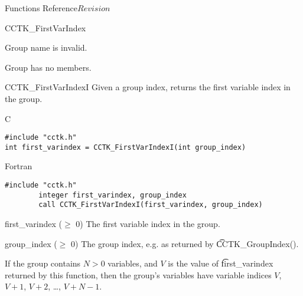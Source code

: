 \begin{cactuspart}{ Functions Reference}{}{$Revision$}
\begin{FunctionDescription}{CCTK\_FirstVarIndex}
\begin{ErrorSection}
\begin{Error}{-1}
Group name is invalid.
\end{Error}
\begin{Error}{-2}
Group has no members.
\end{Error}
\end{ErrorSection}
\end{FunctionDescription}


\begin{FunctionDescription}{CCTK\_FirstVarIndexI}
\label{CCTK-FirstVarIndexI}
Given a group index, returns the first variable index in the group.

\begin{SynopsisSection}
\begin{Synopsis}{C}
\begin{verbatim}
#include "cctk.h"
int first_varindex = CCTK_FirstVarIndexI(int group_index)
\end{verbatim}
\end{Synopsis}
\begin{Synopsis}{Fortran}
\begin{verbatim}
#include "cctk.h"
        integer first_varindex, group_index
        call CCTK_FirstVarIndexI(first_varindex, group_index)
\end{verbatim}
\end{Synopsis}
\end{SynopsisSection}

\begin{ResultSection}
\begin{Result}{first\_varindex ($\ge$ 0)}
The first variable index in the group.
\end{Result}
\end{ResultSection}

\begin{ParameterSection}
\begin{Parameter}{group\_index ($\ge$ 0)}
The group index, e.g. as returned by {\t CCTK\_GroupIndex()}.
\end{Parameter}
\end{ParameterSection}

\begin{Discussion}
If the group contains $N > 0$ variables, and $V$ is the value of
{\t first\_varindex} returned by this function, then the group's
variables have variable indices $V$, $V+1$, $V+2$, \dots, $V+N-1$.
\end{Discussion}


\end{FunctionDescription}
\end{cactuspart}
